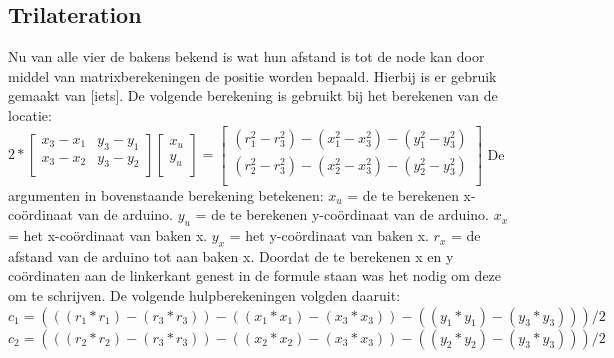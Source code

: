 \documentclass{article}
\begin{document}
\subsection{Trilateration}
Nu van alle vier de bakens bekend is wat hun afstand is tot de node kan door middel van matrixberekeningen de positie worden bepaald. Hierbij is er gebruik gemaakt van [iets]. 
De volgende berekening is gebruikt bij het berekenen van de locatie: \newline
$2*\begin{bmatrix}
       x_3 - x_1 & y_3 - y_1 \\
       x_3 - x_2 & y_3 - y_2 \\          
                
     \end{bmatrix}
     \begin{bmatrix}
       x_u \\          
       y_u \\         
     \end{bmatrix}
=\begin{bmatrix}
       (r_1^2 - r_3^2) - (x_1^2 - x_3^2) - (y_1^2 - y_3^2) \\
       (r_2^2 - r_3^2) - (x_2^2 - x_3^2) - (y_2^2 - y_3^2) \\
     \end{bmatrix}$     
\newline
\newline
De argumenten in bovenstaande berekening betekenen: \newline
$x_u$ = de te berekenen x-co\"{o}rdinaat van de arduino.\newline
$y_u$ = de te berekenen y-co\"{o}rdinaat van de arduino.\newline
$x_x$ = het x-co\"{o}rdinaat van baken x.\newline
$y_x$ = het y-co\"{o}rdinaat van baken x.\newline
$r_x$ = de afstand van de arduino tot aan baken x.\newline
\newline
Doordat de te berekenen x en y co\"{o}rdinaten aan de linkerkant genest in de formule staan was het nodig om deze om te schrijven. De volgende hulpberekeningen volgden daaruit: \newline
$c_1 = (((r_1*r_1)-(r_3*r_3))-((x_1*x_1)-(x_3*x_3))-((y_1*y_1)-(y_3*y_3)))/2 $
\newline
\newline
$c_2 = (((r_2*r_2)-(r_3*r_3))-((x_2*x_2)-(x_3*x_3))-((y_2*y_2)-(y_3*y_3)))/2 $
\end{document}
